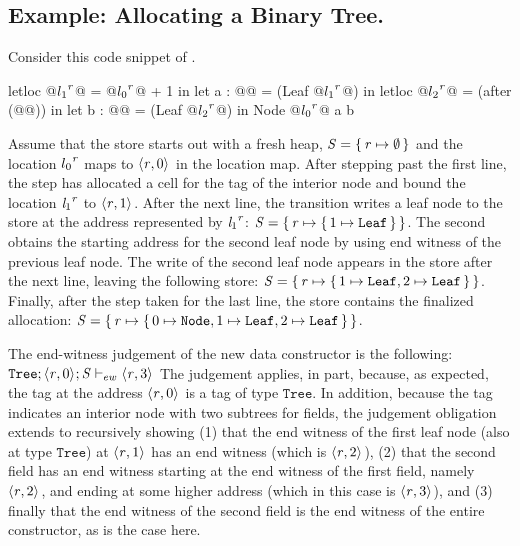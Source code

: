\subsection{Example: Allocating a Binary Tree.}
\label{sec:dynsem-example}
%
Consider this code snippet of \ourcalc{}.
%
\begin{code}
letloc @${l_1}^{\mathit{r}}$@ = @${l_0}^{\mathit{r}}$@ + 1 in
let a : @@ = (Leaf @${l_1}^{\mathit{r}}$@) in
letloc @${l_2}^{\mathit{r}}$@ = (after (@@)) in
let b : @@ = (Leaf @${l_2}^{\mathit{r}}$@) in
Node @${l_0}^{\mathit{r}}$@ a b
\end{code}
%
Assume that the store starts out with a fresh heap, $\mathit{S} = \{ \, \mathit{r}
  \mapsto \emptyset \,\}$ and the location ${l_0}^{\mathit{r}}$ maps to
$\langle \mathit{r}, 0 \rangle ^{}$ in the location map.
%
After stepping past the first line, the \textsc{\dletloctag{}} step has
allocated a cell for the tag of the interior node and bound the
location ${\mathit{l}_1}^{\mathit{r}}$ to $\langle \mathit{r}, 1 \rangle ^{}$.
%
After the next line, the \textsc{\ddatacon{}} transition writes a leaf node to
the store at the address represented by ${\mathit{l}_1}^{\mathit{r}}$:
$\mathit{S} = \{ \, \mathit{r} \mapsto \{ \, 1 \mapsto \mathtt{Leaf} \,\} \,\}$.
%
The second  obtains the starting address for the second
leaf node by using end witness of the previous leaf node.
%
The write of the second leaf node appears in the store after
the next line, leaving the following store:
$
\mathit{S} = \{ \, \mathit{r} \mapsto \{ \, 1 \mapsto \mathtt{Leaf}, 2 \mapsto \mathtt{Leaf} \,\} \,\}$.
%
Finally, after the \textsc{\ddatacon{}} step taken for the last line, the store
contains the finalized allocation:
$\mathit{S} = \{ \, \mathit{r} \mapsto \{ \, 0 \mapsto \mathtt{Node}, 1 \mapsto \mathtt{Leaf}, 2 \mapsto \mathtt{Leaf} \,\} \,\}$.
%

The end-witness judgement of the new data constructor is the
following:
$\mathtt{Tree};\langle \mathit{r}, 0 \rangle ^{};\mathit{S} \vdash_{ew} \langle \mathit{r}, 3 \rangle ^{}$
%
The judgement applies, in part, because, as expected, the tag at the
address $\langle \mathit{r}, 0 \rangle ^{}$ is a tag of type $\mathtt{Tree}$.
%
In addition, because the tag indicates an interior node with two
subtrees for fields, the judgement obligation extends to recursively
showing (1) that the end witness of the first leaf node (also at type
$\mathtt{Tree}$) at $\langle \mathit{r}, 1 \rangle ^{}$ has an end witness
(which is $\langle \mathit{r}, 2 \rangle ^{}$), (2) that the second field has an
end witness starting at the end witness of the first field, namely
$\langle \mathit{r}, 2 \rangle ^{}$, and ending at some higher address (which in
this case is $\langle \mathit{r}, 3 \rangle ^{}$), and (3) finally that the end
witness of the second field is the end witness of the entire
constructor, as is the case here.

